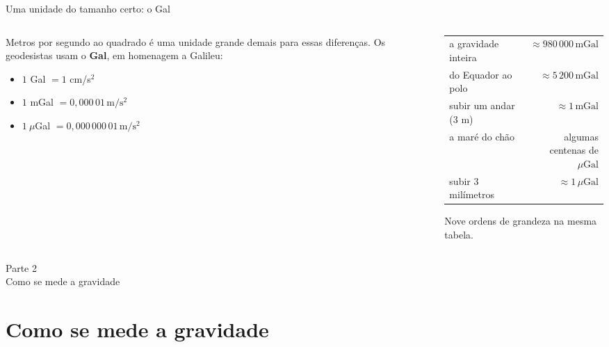 \documentclass[aspectratio=169,11pt]{beamer}
\newcommand{\bnum}[1]{\textbf{\textcolor{mTeal}{#1}}}
\newcommand{\mGal}{\ensuremath{\,\mathrm{mGal}}\xspace}
\newcommand{\uGal}{\ensuremath{\,\mu\mathrm{Gal}}\xspace}
\newcommand{\mss}{\ensuremath{\,\mathrm{m/s^2}}\xspace}
\begin{document}
\begin{frame}{Uma unidade do tamanho certo: o Gal}
  \begin{columns}[T]
    \begin{column}{0.46\textwidth}
      Metros por segundo ao quadrado é uma unidade grande demais para essas diferenças. Os
      geodesistas usam o \bnum{Gal}, em homenagem a Galileu:
      \medskip
      \begin{itemize}
        \item $1$ Gal $= 1$ cm/s$^2$
        \item $1$ mGal $= 0{,}000\,01$\mss
        \item $1\ \mu$Gal $= 0{,}000\,000\,01$\mss
      \end{itemize}
    \end{column}
    \begin{column}{0.50\textwidth}
      \begin{ideia}[title={A escadinha dos tamanhos}]
        \scriptsize
        \renewcommand{\arraystretch}{1.35}
        \begin{tabular}{@{}lr@{}}
          a gravidade inteira & $\approx 980\,000$\mGal \\
          do Equador ao polo & $\approx 5\,200$\mGal \\
          subir um andar (3 m) & $\approx 1$\mGal \\
          a maré do chão & algumas centenas de \uGal \\
          subir 3 milímetros & $\approx 1$\uGal \\
        \end{tabular}
      \end{ideia}
      \medskip
      {\small Nove ordens de grandeza na mesma tabela.}
    \end{column}
  \end{columns}
\end{frame}

\begin{frame}[standout]
  Parte 2\\[6pt]
  {\normalsize Como se mede a gravidade}
\end{frame}

\section{Como se mede a gravidade}
\end{document}

